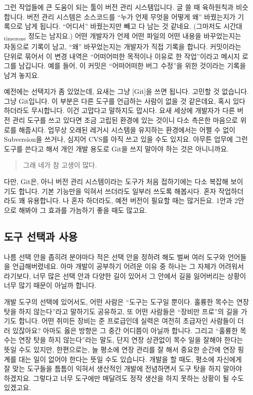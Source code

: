 \documentclass[11pt,a4paper]{article}
\newcommand{\sub}[1]{\textsubscript{#1}}
\begin{document}
그런 작업들에 큰 도움이 되는 툴이 버전 관리 시스템입니다. 글 쓸 때 육하원칙과 비슷합니다. 버전 관리 시스템은 소스코드를 ``누가 언제 무엇을 어떻게 왜'' 바꿨는지가 기록으로 남게 됩니다. ``어디서'' 바꿨는지만 빼고 다 남는 것 같네요. (그마저도 시간대\sub{timezone} 정도는 남지요.) 어떤 개발자가 언제 어떤 파일의 어떤 내용을 바꾸었는지는 자동으로 기록이 남고, ``왜'' 바꾸었는지는 개발자가 직접 기록을 합니다. 커밋이라는 단위로 묶어서 이 변경 내역은 ``어떠어떠한 목적이나 이유로 한 작업''이라고 메시지 로그를 남깁니다. 예를 들어, 이 커밋은 ``어떠어떠한 버그 수정''을 위한 것이라는 기록을 남겨 놓지요.

예전에는 선택지가 좀 있었는데, 요새는 그냥 [Git]을 쓰면 됩니다. 고민할 것 없습니다. 그냥 Git입니다. 이 부분은 다른 도구를 언급하는 사람이 없을 것 같은데요, 혹시 있다 하더라도 무시합니다. 이건 고맙다고 말하지도 맙시다. 요새 세상에 개발자가 다른 버전 관리 도구를 쓰고 있다면 조금 고립된 환경에 있는 것이니 다소 측은한 마음으로 위로를 해줍시다. 업무상 오래된 레거시 시스템을 유지하는 환경에서는 어쩔 수 없이 Subversion을 쓰거나, 심지어 CVS를 아직 쓰고 있을 수도 있지요. 아무튼 업무에 그런 도구를 쓴다고 해서 개인 개발 용도로 Git을 쓰지 말아야 하는 것은 아니니까요.

\begin{quote}
그래 네가 참 고생이 많다.
\end{quote}

다만, Git은, 아니 버전 관리 시스템이라는 도구가 처음 접하기에는 다소 복잡해 보이기도 합니다. 기본 기능만을 익혀서 쓰더라도 일부러 쓰도록 해봅시다. 혼자 작업하더라도 꽤 유용합니다. 나 혼자 하더라도, 예전 버전이 필요할 때는 많거든요. 1안과 2안으로 해봐야 그 효과를 가늠하기 좋을 때도 많고요.

\subsection{도구 선택과 사용}

나름 선택 안을 좁히려 분야마다 적은 선택 안을 정하려 해도 벌써 여러 도구와 언어들을 언급해버렸네요. 아마 개발이 공부하기 어려운 이유 중 하나는 그 자체가 어려워서라기보다, 너무 많은 선택 안과 다양한 길이 있어서 그 안에서 길을 잃어버리는 상황이 너무 많기 때문이 아닐까 합니다.

개발 도구의 선택에 있어서도, 어떤 사람은 ``도구는 도구일 뿐이다. 훌륭한 목수는 연장 탓을 하지 않는다''라고 말하기도 공유하고, 또 어떤 사람들은 ``장비만 프로''의 길을 가기도 합니다. 어떤 취미든 장비는 준 프로급인데 실력은 여전히 초급자인 사람들이 더러 있잖아요? 아마도 옳은 방향은 그 중간 어디쯤이 아닐까 합니다. 그리고 ``훌륭한 목수는 연장 탓을 하지 않는다''라는 말도, 단지 연장 상관없이 목수 일을 잘해야 한다는 뜻일 수도 있지만, 한편으로는, 늘 평소에 연장 관리를 잘 해서 중요한 순간에 연장 핑계를 대는 일이 없어야 한다는 뜻일 수도 있습니다. 개발을 할 때도, 평소에 자신에게 잘 맞는 도구들을 틈틈이 익혀서 생산적인 개발에 전념하면서 도구 탓을 하지 말아야 하겠지요. 그렇다고 너무 도구에만 매달려도 정작 생산을 하지 못하는 상황이 될 수도 있겠고요.
\end{document}
